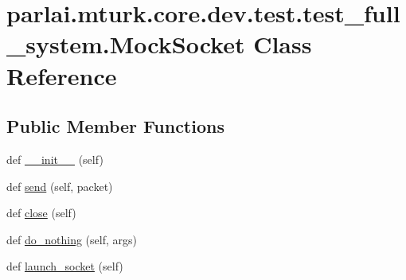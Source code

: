 \hypertarget{classparlai_1_1mturk_1_1core_1_1dev_1_1test_1_1test__full__system_1_1MockSocket}{}\section{parlai.\+mturk.\+core.\+dev.\+test.\+test\+\_\+full\+\_\+system.\+Mock\+Socket Class Reference}
\label{classparlai_1_1mturk_1_1core_1_1dev_1_1test_1_1test__full__system_1_1MockSocket}
\subsection*{Public Member Functions}
\begin{DoxyCompactItemize}
\item 
def \hyperlink{classparlai_1_1mturk_1_1core_1_1dev_1_1test_1_1test__full__system_1_1MockSocket_a6071401c1d99ecfa1627e9578caeab40}{\+\_\+\+\_\+init\+\_\+\+\_\+} (self)
\item 
def \hyperlink{classparlai_1_1mturk_1_1core_1_1dev_1_1test_1_1test__full__system_1_1MockSocket_a76c6347ad0156076cfc74a935821ce78}{send} (self, packet)
\item 
def \hyperlink{classparlai_1_1mturk_1_1core_1_1dev_1_1test_1_1test__full__system_1_1MockSocket_af4078b6c90d1736d84a0c99aa6bc7bc0}{close} (self)
\item 
def \hyperlink{classparlai_1_1mturk_1_1core_1_1dev_1_1test_1_1test__full__system_1_1MockSocket_a3d42a7db9d3f33251387a8fb33d8e3f4}{do\+\_\+nothing} (self, args)
\item 
def \hyperlink{classparlai_1_1mturk_1_1core_1_1dev_1_1test_1_1test__full__system_1_1MockSocket_aed1817eae62c10b92b2d60384b4515d2}{launch\+\_\+socket} (self)
\end{DoxyCompactItemize}
